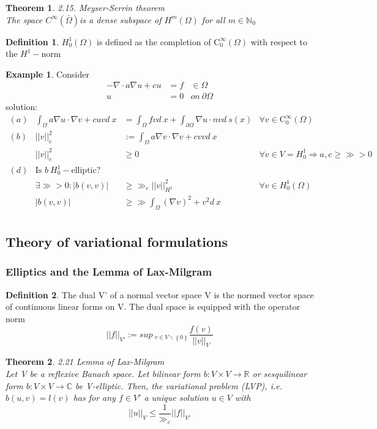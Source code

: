 \documentclass[english]{article}
\newtheorem*{theorem}{Theorem}
\theoremstyle{definition}
\newtheorem*{defi}{Definition}
\newtheorem*{exa}{Example}
\theoremstyle{remark}
\newcommand{\f}[2]{\frac{#1}{#2}}							%
\newcommand{\p}{\partial}
\newcommand{\NN}{\mathbb{N}}			%
\newcommand{\RR}{\mathbb{R}}			%
\newcommand{\CC}{\mathbb{C}}			%
\newcommand{\OO}{\Omega}
\newcommand{\cinf}{\tx{C}^\infty}
\newcommand{\drw}{\Rightarrow}			%
\newcommand{\tri}{\nabla}
\newcommand{\tx}[1]{\text{#1}}
\begin{document}
\begin{theorem} 2.15. Meyser-Serrin theorem\\
  The space $C^\infty(\bar\OO)$is a dense subspace of $H^m(\OO)$ for all $m \in \NN_0$
\end{theorem}
\begin{defi}
  $H^1 _0 (\OO)$ is defined as the completion of $\cinf_0(\OO)$ with respect to the $H^1-$norm
\end{defi}
\begin{exa}
  Consider
  \begin{align*}
    -\tri \cdot a \tri u + cu & = f & \in \OO \\
    u                         & =0  & on\ \p\OO
  \end{align*}
  solution:
  \begin{align*}
    (a) & \int_\OO a \tri u \cdot \tri v + cuv d\ x & = \int_\OO fv d\ x + \int_{\p\OO} \tri u \cdot n v d\ s(x) & \forall v \in \cinf_0(\OO)                 \\
    (b) & ||v||_e ^2                                & := \int_\OO a \tri v \cdot \tri v + cvv d\ x                                                            \\
    & ||v||_e ^2                                & \geq 0                                                     & \forall v \in V=H_0 ^1 \drw a,c\geq \gg >0 \\
    (d) & \tx{Is }b \ H^1 _0-\tx{elliptic}?                                                                                                                   \\
    & \exists \gg>0:|b(v,v)|                    & \geq \gg_e||v||_{H^1}^2                                    & \forall v \in H_0 ^1(\OO)                  \\
    & |b(v,v)|                                  & \geq\gg\int_\OO (\tri v)^2 + v^2 d\ x                                                                   \\
  \end{align*}
\end{exa}
\subsection{Theory of variational formulations}
\subsubsection{Elliptics and the Lemma of Lax-Milgram}
\begin{defi} The dual V' of a normal vector space V is the normed vector space of continuous linear forms on V. The dual space is equipped with the operator norm 
  $$||f||_{V'} := sup\ _{v \in V\backslash \left\{0\right\}} \f{f(v)}{||v||_V}$$
\end{defi}
\begin{theorem}2.21 Lemma of Lax-Milgram\\
  Let V be a reflexive Banach space. Let bilinear form $b:V \times V \to \RR$ or sesquilinear form $b:V\times V \to \CC$ be V-elliptic. Then, the variational problem (LVP), i.e. $b(u,v) = l(v)$ has for any $f \in V'$ a unique solution $u \in V$ with 
  $$||u||_V \leq \f{1}{\gg_e}||f||_{V'}$$
\end{theorem}
\end{document}
